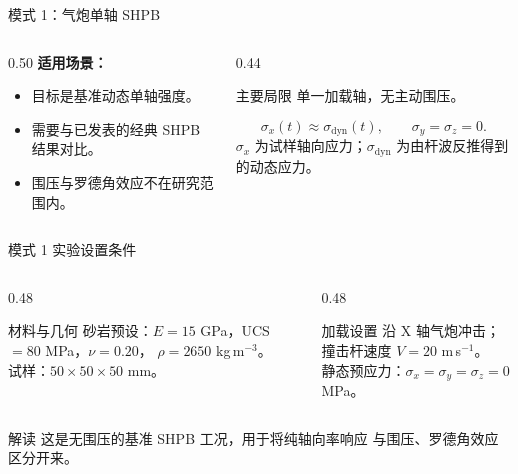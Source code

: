 \documentclass[11pt,aspectratio=169]{beamer}
\newcommand{\cncue}[1]{{\footnotesize\color{TUSTmidgray} #1}}
\begin{document}
\begin{frame}{模式 1：气炮单轴 SHPB}
  \begin{columns}[T,onlytextwidth]
    \begin{column}{0.50\textwidth}
      \textbf{适用场景：}
      \begin{itemize}
        \item 目标是基准动态单轴强度。
        \item 需要与已发表的经典 SHPB 结果对比。
        \item 围压与罗德角效应不在研究范围内。
      \end{itemize}
    \end{column}
    \begin{column}{0.44\textwidth}
      \begin{block}{主要局限}
        单一加载轴，无主动围压。
      \end{block}
      \[
        \sigma_x(t)\approx\sigma_{\mathrm{dyn}}(t), \qquad
        \sigma_y=\sigma_z=0 .
      \]
      \cncue{$\sigma_x$ 为试样轴向应力；$\sigma_{\mathrm{dyn}}$ 为由杆波反推得到的动态应力。}
    \end{column}
  \end{columns}
\end{frame}

\begin{frame}{模式 1 实验设置条件}
  \small
  \begin{columns}[T,onlytextwidth]
    \begin{column}{0.48\textwidth}
      \begin{block}{材料与几何}
        砂岩预设：$E=15$ GPa，UCS $=80$ MPa，$\nu=0.20$，
        $\rho=2650$ kg\,m$^{-3}$。\\[3pt]
        试样：$50\times50\times50$ mm。
      \end{block}
    \end{column}
    \begin{column}{0.48\textwidth}
      \begin{exampleblock}{加载设置}
        沿 X 轴气炮冲击；撞击杆速度 $V=20$ m\,s$^{-1}$。\\[3pt]
        静态预应力：$\sigma_x=\sigma_y=\sigma_z=0$ MPa。
      \end{exampleblock}
    \end{column}
  \end{columns}
  \vspace{0.2cm}
  \begin{block}{解读}
    这是无围压的基准 SHPB 工况，用于将纯轴向率响应
    与围压、罗德角效应区分开来。
  \end{block}
\end{frame}
\end{document}
